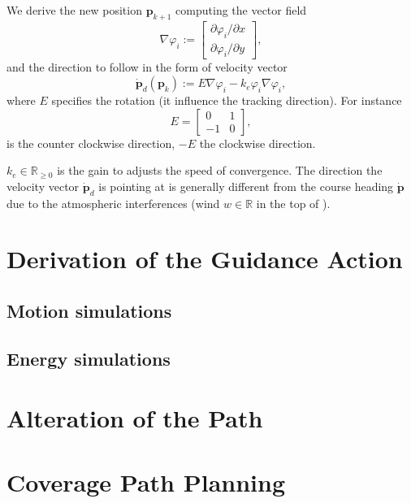 We derive the new position $\mathbf{p}_{k+1}$ computing the vector field 
 \begin{equation}
   \nabla\varphi_i:=\begin{bmatrix}\partial\varphi_i/\partial x \\ \partial\varphi_i/\partial y\end{bmatrix},  
 \end{equation}
 and the direction to follow in the form of velocity vector~\cite{de2017guidance}
 \begin{equation}\label{eq:pd}
   \dot{\mathbf{p}}_d(\mathbf{p}_k):=E\nabla\varphi_i-k_e\varphi_i\nabla\varphi_i,
 \end{equation}
 where $E$ specifies the rotation (it influence the tracking direction). For instance
 \begin{equation}
   E=\begin{bmatrix}
     0&1\\-1&0
   \end{bmatrix},
 \end{equation}
 is the counter clockwise direction, $-E$ the clockwise direction. 
 
 $k_e\in\mathbb{R}_{\geq 0}$ is the gain to adjusts the speed of convergence. The direction the velocity vector $\dot{\mathbf{p}}_d$ is pointing at is generally different from the course heading $\dot{\mathbf{p}}$ due to the atmospheric interferences (wind $w\in\mathbb{R}$ in the top of ).

\section{\color{red}Derivation of the Guidance Action}

\subsection{\color{red}Motion simulations}

\subsection{\color{red}Energy simulations}


\section{\color{red}Alteration of the Path}


\section{Coverage Path Planning}
\label{sec:cov-path-plan}

